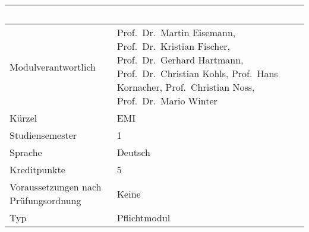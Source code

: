 \begin{longtable}[]{@{}ll@{}}
\toprule
\begin{minipage}[b]{0.12\columnwidth}\raggedright\strut
~\strut
\end{minipage} & \begin{minipage}[b]{0.12\columnwidth}\raggedright\strut
~\strut
\end{minipage}\tabularnewline
\midrule
\endhead
\begin{minipage}[t]{0.12\columnwidth}\raggedright\strut
Modulverantwortlich\strut
\end{minipage} & \begin{minipage}[t]{0.12\columnwidth}\raggedright\strut
Prof.~Dr.~Martin Eisemann, Prof.~Dr.~Kristian Fischer, Prof.~Dr.~Gerhard
Hartmann, Prof.~Dr.~Christian Kohls, Prof.~Hans Kornacher,
Prof.~Christian Noss, Prof.~Dr.~Mario Winter\strut
\end{minipage}\tabularnewline
\begin{minipage}[t]{0.12\columnwidth}\raggedright\strut
Kürzel\strut
\end{minipage} & \begin{minipage}[t]{0.12\columnwidth}\raggedright\strut
EMI\strut
\end{minipage}\tabularnewline
\begin{minipage}[t]{0.12\columnwidth}\raggedright\strut
Studiensemester\strut
\end{minipage} & \begin{minipage}[t]{0.12\columnwidth}\raggedright\strut
1\strut
\end{minipage}\tabularnewline
\begin{minipage}[t]{0.12\columnwidth}\raggedright\strut
Sprache\strut
\end{minipage} & \begin{minipage}[t]{0.12\columnwidth}\raggedright\strut
Deutsch\strut
\end{minipage}\tabularnewline
\begin{minipage}[t]{0.12\columnwidth}\raggedright\strut
Kreditpunkte\strut
\end{minipage} & \begin{minipage}[t]{0.12\columnwidth}\raggedright\strut
5\strut
\end{minipage}\tabularnewline
\begin{minipage}[t]{0.12\columnwidth}\raggedright\strut
Voraussetzungen nach Prüfungsordnung\strut
\end{minipage} & \begin{minipage}[t]{0.12\columnwidth}\raggedright\strut
Keine\strut
\end{minipage}\tabularnewline
\begin{minipage}[t]{0.12\columnwidth}\raggedright\strut
Typ\strut
\end{minipage} & \begin{minipage}[t]{0.12\columnwidth}\raggedright\strut
Pflichtmodul\strut
\end{minipage}\tabularnewline
\bottomrule
\end{longtable}

